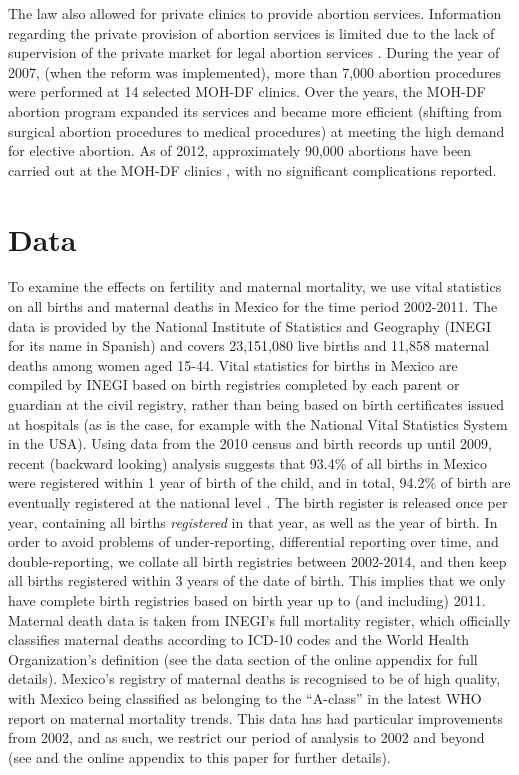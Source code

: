 \documentclass[a4paper, 11pt]{article}
\begin{document}
\begin{spacing}{2}
The law also allowed for private clinics to provide abortion services. Information regarding the private provision of abortion services is limited due to the lack of supervision of the private market for legal abortion services \citep{Becker2013}. During the year of 2007, (when the reform was implemented), more than 7,000 abortion procedures were performed at 14 selected MOH-DF clinics. Over the years, the MOH-DF abortion program expanded its services and became more efficient (shifting from surgical abortion procedures to medical procedures) at meeting the high demand for elective abortion. As of 2012, approximately 90,000 abortions have been carried out at the MOH-DF clinics \citep{Becker2013}, with no significant complications reported.

\section{Data}
\label{scn:data}
To examine the effects on fertility and maternal mortality, we use vital statistics on all births and maternal deaths in Mexico for the time period 2002-2011. The data is provided by the National Institute of Statistics and Geography (INEGI for its name in Spanish) and covers 23,151,080 live births and 11,858 maternal deaths among women aged 15-44.  Vital statistics for births in Mexico are compiled by INEGI based on birth registries completed by each parent or guardian at the civil registry, rather than being based on birth certificates issued at hospitals (as is the case, for example with the National Vital Statistics System in the USA).  Using data from the 2010 census and birth records up until 2009, recent (backward looking) analysis suggests that 93.4\% of all births in Mexico were registered within 1 year of birth of the child, and in total, 94.2\% of birth are eventually registered at the national level \citep{INEGI2012}.  The birth register is released once per year, containing all births \emph{registered} in that year, as well as the year of birth.  In order to avoid problems of under-reporting, differential reporting over time, and double-reporting, we collate all birth registries between 2002-2014, and then keep all births registered within 3 years of the date of birth.  This implies that we only have complete birth registries based on birth year up to (and including) 2011.  Maternal death data is taken from INEGI's full mortality register, which officially classifies maternal deaths according to ICD-10 codes and the World Health Organization's definition (see the data section of the online appendix for full details).  Mexico's registry of maternal deaths is recognised to be of high quality, with Mexico being classified as belonging to the ``A-class'' \citep{WHO1987} in the latest WHO report on maternal mortality trends.  This data has had particular improvements from 2002, and as such, we restrict our period of analysis to 2002 and beyond (see \citet{Schiavonetal2012} and the online appendix to this paper for further details).  


\end{spacing}
\end{document}
